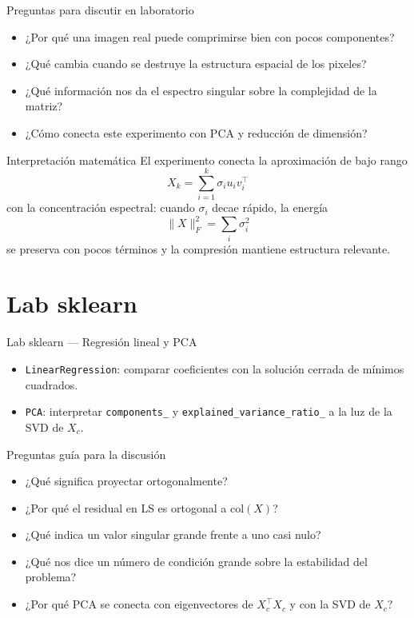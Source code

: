 \begin{frame}{Preguntas para discutir en laboratorio}
\begin{itemize}\small
  \item ¿Por qué una imagen real puede comprimirse bien con pocos componentes?
  \item ¿Qué cambia cuando se destruye la estructura espacial de los pixeles?
  \item ¿Qué información nos da el espectro singular sobre la complejidad de la matriz?
  \item ¿Cómo conecta este experimento con PCA y reducción de dimensión?
\end{itemize}
\vspace{0.4em}
\begin{block}{Interpretación matemática}
\small
El experimento conecta la aproximación de bajo rango
\[
X_k=\sum_{i=1}^k \sigma_i u_i v_i^\top
\]
con la concentración espectral: cuando $\sigma_i$ decae rápido, la energía
\[
\|X\|_F^2=\sum_i \sigma_i^2
\]
se preserva con pocos términos y la compresión mantiene estructura relevante.
\end{block}
\end{frame}

\section[Lab sklearn]{Lab sklearn\label{sec:lab-sklearn-w07-final}}

\begin{frame}{Lab sklearn — Regresión lineal y PCA}
\begin{itemize}\small
  \item \texttt{LinearRegression}: comparar coeficientes con la solución cerrada de mínimos cuadrados.
  \item \texttt{PCA}: interpretar \texttt{components\_} y \texttt{explained\_variance\_ratio\_} a la luz de la SVD de $X_c$.
\end{itemize}
\end{frame}

\begin{frame}{Preguntas guía para la discusión}
\begin{itemize}\small
  \item ¿Qué significa proyectar ortogonalmente?
  \item ¿Por qué el residual en LS es ortogonal a $\mathrm{col}(X)$?
  \item ¿Qué indica un valor singular grande frente a uno casi nulo?
  \item ¿Qué nos dice un número de condición grande sobre la estabilidad del problema?
  \item ¿Por qué PCA se conecta con eigenvectores de $X_c^\top X_c$ y con la SVD de $X_c$?
\end{itemize}
\end{frame}
